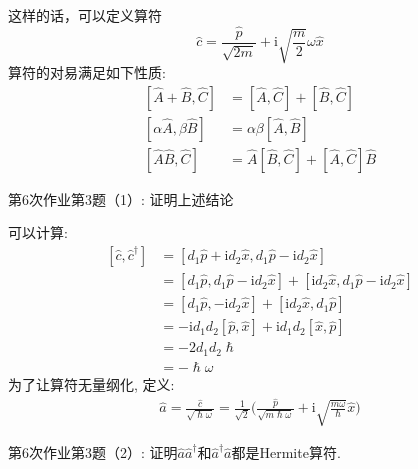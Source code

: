         这样的话，可以定义算符
        \[ \hat{c} = \frac {\hat{p}}{\sqrt{2m}} + \mathrm{i}\sqrt{\frac m2}\omega \hat{x} \]
        算符的对易满足如下性质: 
        \begin{equation}
            \begin{aligned}
                \left[\hat{A} + \hat{B},\hat{C}\right] &= [\hat{A},\hat{C}]+[\hat{B},\hat{C}]\\
                [\alpha \hat{A}, \beta \hat{B}] &= \alpha \beta [\hat{A},\hat{B}]\\
                [\hat{A}\hat{B},\hat{C}] &= \hat{A}[\hat{B},\hat{C}] + [\hat{A},\hat{C}]\hat{B}
            \end{aligned}
        \end{equation}
        \begin{asg}
            第6次作业第3题（1）: 证明上述结论
        \end{asg}
        可以计算:
        \begin{equation}
            \begin{aligned}
                \left[\hat{c},\hat{c}^\dagger\right] &= [d_1\hat{p} +\mathrm{i}d_2\hat{x}, d_1\hat{p} - \mathrm{i}d_2\hat{x}]\\
                &= [d_1\hat{p}, d_1\hat{p} - \mathrm{i}d_2\hat{x}] + [\mathrm{i}d_2\hat{x}, d_1\hat{p} - \mathrm{i}d_2\hat{x}]\\
                &= [d_1\hat{p}, -\mathrm{i}d_2\hat{x}] + [\mathrm{i}d_2\hat{x}, d_1\hat{p}]\\
                &= -\mathrm{i}d_1d_2[\hat{p},\hat{x}] + \mathrm{i}d_1d_2[\hat{x},\hat{p}]\\
                &= -2d_1d_2\hslash\\
                &= -\hslash \omega
            \end{aligned}
        \end{equation}
        为了让算符无量纲化, 定义:
        \begin{equation}\begin{aligned}
            \hat{a} = \frac {\hat{c}}{\sqrt{\hslash \omega}} =\frac 1{\sqrt{2}} \bigg(\frac {\hat{p}}{\sqrt{m\hslash\omega}} + \mathrm{i}\sqrt{\frac {m\omega}{\hslash}} \hat{x}\bigg)
        \end{aligned}\end{equation}
        \begin{asg}
            第6次作业第3题（2）: 证明$\hat{a}\hat{a}^\dagger$和$\hat{a}^\dagger\hat{a}$都是Hermite算符.
        \end{asg}
